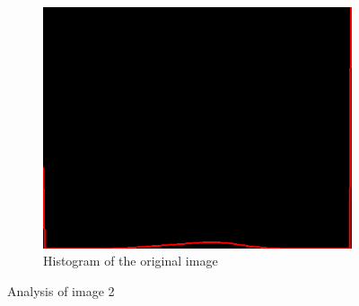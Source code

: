 \begin{figure}[H]
\begin{subfigure}[b]{0.485\textwidth}
        \includegraphics[width=\textwidth]{img2/hist_org_img2.png}
        \caption{Histogram of the original image}
        \label{fig:img2_hist}
    \end{subfigure}
    \caption{Analysis of image 2}\label{fig:img2}
\end{figure}

